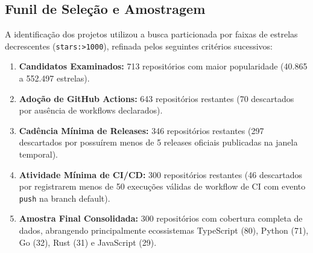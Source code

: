 \documentclass[12pt]{article}
\begin{document}
\subsection{Funil de Seleção e Amostragem}
A identificação dos projetos utilizou a busca particionada por faixas de estrelas decrescentes (\texttt{stars:>1000}), refinada pelos seguintes critérios sucessivos:
\begin{enumerate}
    \item \textbf{Candidatos Examinados:} 713 repositórios com maior popularidade (40.865 a 552.497 estrelas).
    \item \textbf{Adoção de GitHub Actions:} 643 repositórios restantes (70 descartados por ausência de workflows declarados).
    \item \textbf{Cadência Mínima de Releases:} 346 repositórios restantes (297 descartados por possuírem menos de 5 releases oficiais publicadas na janela temporal).
    \item \textbf{Atividade Mínima de CI/CD:} 300 repositórios restantes (46 descartados por registrarem menos de 50 execuções válidas de workflow de CI com evento \texttt{push} na branch default).
    \item \textbf{Amostra Final Consolidada:} 300 repositórios com cobertura completa de dados, abrangendo principalmente ecossistemas TypeScript (80), Python (71), Go (32), Rust (31) e JavaScript (29).
\end{enumerate}
\end{document}
